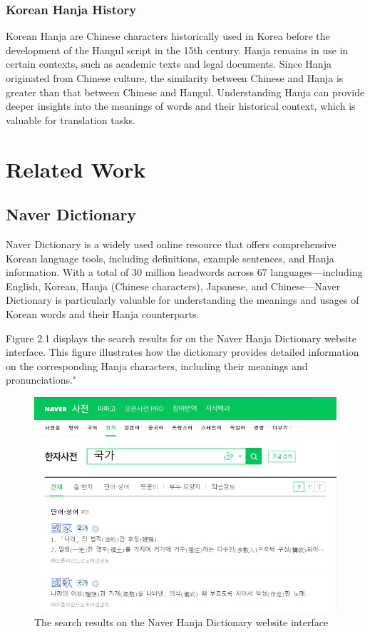 \documentclass[PhD]{PHlab-thesis}
\begin{document}
\subsection{Korean Hanja History}
Korean Hanja are Chinese characters historically used in Korea before the development of the Hangul script in the 15th century. Hanja remains in use in certain contexts, such as academic texts and legal documents. Since Hanja originated from Chinese culture, the similarity between Chinese and Hanja is greater than that between Chinese and Hangul. Understanding Hanja can provide deeper insights into the meanings of words and their historical context, which is valuable for translation tasks. 


\chapter{Related Work}
\section{Naver Dictionary}
Naver Dictionary\cite{NaverDictionary} is a widely used online resource that offers comprehensive Korean language tools, including definitions, example sentences, and Hanja information. With a total of 30 million headwords across 67 languages—including English, Korean, Hanja (Chinese characters), Japanese, and Chinese—Naver Dictionary is particularly valuable for understanding the meanings and usages of Korean words and their Hanja counterparts.

Figure 2.1 displays the search results for  on the Naver Hanja Dictionary website interface. This figure illustrates how the dictionary provides detailed information on the corresponding Hanja characters, including their meanings and pronunciations."

\begin{figure}[h!]
  \centering
  \includegraphics[width=\linewidth]{fig_2_1.jpg}
  \captionsetup{type=figure}
  \caption{The search results on the Naver Hanja Dictionary website interface}
  \label{fig:naver dictionary}
\end{figure}
\end{document}
